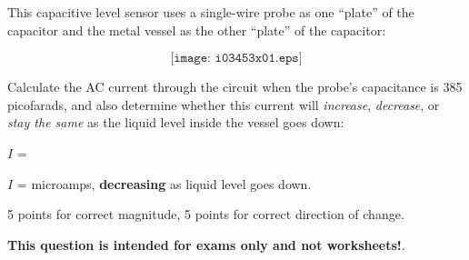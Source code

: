 

This capacitive level sensor uses a single-wire probe as one ``plate'' of the capacitor and the metal vessel as the other ``plate'' of the capacitor:

$$\texttt{[image: i03453x01.eps]}$$

Calculate the AC current through the circuit when the probe's capacitance is 385 picofarads, and also determine whether this current will {\it increase}, {\it decrease}, or {\it stay the same} as the liquid level inside the vessel goes down:

\vskip 10pt

$I$ = \underbar{\hskip 50pt}







$I$ =  microamps, {\bf decreasing} as liquid level goes down.

\vskip 10pt

5 points for correct magnitude, 5 points for correct direction of change.







{\bf This question is intended for exams only and not worksheets!}.


